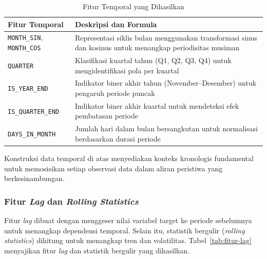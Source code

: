 \begin{table}[htbp]
\centering
\caption{Fitur Temporal yang Dihasilkan}
\label{tab:fitur-temporal}
\begin{tabular}{|p{4cm}|p{9cm}|}
\hline
\textbf{Fitur Temporal} & \textbf{Deskripsi dan Formula} \\
\hline
\texttt{MONTH\_SIN}, \texttt{MONTH\_COS} & Representasi siklis bulan menggunakan transformasi sinus dan kosinus untuk menangkap periodisitas musiman \\
\hline
\texttt{QUARTER} & Klasifikasi kuartal tahun (Q1, Q2, Q3, Q4) untuk mengidentifikasi pola per kuartal \\
\hline
\texttt{IS\_YEAR\_END} & Indikator biner akhir tahun (November--Desember) untuk pengaruh periode puncak \\
\hline
\texttt{IS\_QUARTER\_END} & Indikator biner akhir kuartal untuk mendeteksi efek pembatasan periode \\
\hline
\texttt{DAYS\_IN\_MONTH} & Jumlah hari dalam bulan bersangkutan untuk normalisasi berdasarkan durasi periode \\
\hline
\end{tabular}
\end{table}

Konstruksi data temporal di atas menyediakan konteks kronologis fundamental untuk memosisikan setiap observasi data dalam aliran peristiwa yang berkesinambungan.

\subsubsection{Fitur \textit{Lag} dan \textit{Rolling Statistics}}

Fitur \textit{lag} dibuat dengan menggeser nilai variabel target ke periode sebelumnya untuk menangkap dependensi temporal. Selain itu, statistik bergulir (\textit{rolling statistics}) dihitung untuk menangkap tren dan volatilitas. Tabel~\ref{tab:fitur-lag} menyajikan fitur \textit{lag} dan statistik bergulir yang dihasilkan.

